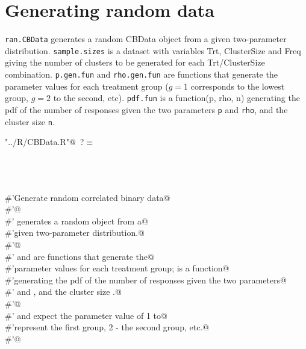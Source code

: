 \documentclass[reqno]{amsart}
\renewcommand{\NWtarget}[2]{\hypertarget{#1}{#2}}
\begin{document}
\section{Generating random data}
\texttt{ran.CBData} generates a random CBData object from a given two-parameter
distribution. \texttt{sample.sizes} is a dataset with variables Trt, ClusterSize and
Freq giving the number of clusters to be generated for each Trt/ClusterSize combination.
\texttt{p.gen.fun} and \texttt{rho.gen.fun} are functions that generate the parameter
values for each treatment group ($g=1$ corresponds to the lowest group, $g=2$ to the
second, etc). \texttt{pdf.fun} is a function(p, rho, n) generating the pdf of the
number of responses given the two parameters \texttt{p} and \texttt{rho}, and the
cluster size \texttt{n}.

\begin{flushleft} \small\label{scrap14}\raggedright\small
\NWtarget{nuweb?}{} \verb@"../R/CBData.R"@\nobreak\ {\footnotesize {?}}$\equiv$
\vspace{-1ex}
\begin{list}{}{} \item
\mbox{}\verb@@\\
\mbox{}\verb@@\\
\mbox{}\verb@@\\
\mbox{}\verb@#'Generate random correlated binary data@\\
\mbox{}\verb@#'@\\
\mbox{}\verb@#' generates a random  object from a@\\
\mbox{}\verb@#'given two-parameter distribution.@\\
\mbox{}\verb@#'@\\
\mbox{}\verb@#' and  are functions that generate the@\\
\mbox{}\verb@#'parameter values for each treatment group;  is a function@\\
\mbox{}\verb@#'generating the pdf of the number of responses given the two parameters@\\
\mbox{}\verb@#' and , and the cluster size .@\\
\mbox{}\verb@#'@\\
\mbox{}\verb@#' and  expect the parameter value of 1 to@\\
\mbox{}\verb@#'represent the first group, 2 - the second group, etc.@\\
\mbox{}\verb@#'@\\

\end{list}
\end{flushleft}
\end{document}
